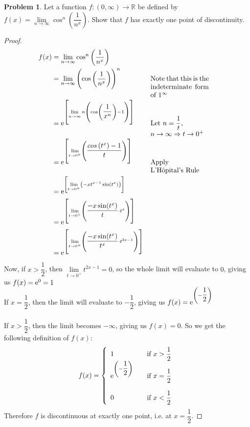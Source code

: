 \documentclass[14]{article}
\theoremstyle{definition}
\newtheorem{prob}{Problem}
\theoremstyle{case}
\begin{document}
\pagebreak
\begin{prob}
Let a function $f:(0, \infty) \to \mathbb{R}$ be defined by $f(x) = \lim\limits_{n \to \infty} \cos^n\left(\dfrac1{n^x}\right)$. Show that $f$ has exactly one point of discontinuity.\\
\begin{proof}
\begin{align*}
f(x) &= \lim\limits_{n \to \infty} \cos^n\left(\dfrac1{n^x}\right)\\
&= \lim\limits_{n \to \infty} \left(\cos\left( \dfrac1{n^x} \right) \right)^n && \parbox[t]{3cm}{Note that this is the indeterminate form of $1^\infty$}\\
&={\rm e}^{\left[
\lim\limits_{n \to \infty} n \left( \cos\left(\dfrac1{x^n}\right) - 1 \right)
\right]} && \parbox[t]{3cm}{Let $n = \dfrac1t$,\\$n \to \infty \Rightarrow t \to 0^+$}\\
&={\rm e}^{\left[
\lim\limits_{t \to 0^+} \left( \dfrac{cos\left(t^x\right) - 1}{t} \right)
\right]} && \parbox[t]{3cm}{Apply\\ L'Hôpital's Rule}\\
&={\rm e}^{\left[
\lim\limits_{t \to 0^+} \left( -x t^{x-1} \sin(t^x) \right)
\right]}\\
&={\rm e}^{\left[
\lim\limits_{t \to 0^+} \left( \dfrac{-x \sin(t^x)}{t} \cdot t^{x} \right)
\right]}\\
&={\rm e}^{\left[
\lim\limits_{t \to 0^+} \left( \dfrac{-x \sin(t^x)}{t^x} \cdot t^{2x-1} \right)
\right]}\\
\end{align*}
Now, if $x > \dfrac12$, then $\lim\limits_{t \to 0^+} t^{2x-1} = 0$, so the whole limit will evaluate to $0$, giving us $f(x) ={\rm e}^0 = 1$\\
If $x = \dfrac12$, then the limit will evaluate to $-\dfrac12$, giving us $f(x) ={\rm e}^{\left(-\dfrac12\right)}$\\\\
If $x > \dfrac12$, then the limit becomes $-\infty$, giving us $f(x) = 0$.
So we get the following definition of $f(x)$:\\
\[
f(x) = \left\{
        \begin{array}{ll}
            1 & \quad \text{if } x > \dfrac12 \\
            {\rm e}^{\left(-\dfrac12\right)} & \quad \text{if } x = \dfrac12\\\\
            0 & \quad \text{if } x < \dfrac12
        \end{array}
    \right.
\]
Therefore $f$ is discontinuous at exactly one point, i.e. at $x = \dfrac12$.
\end{proof}
\end{prob}
\end{document}
